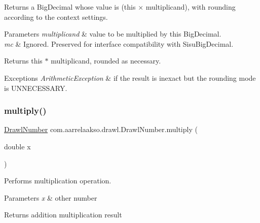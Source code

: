 Returns a Big\+Decimal whose value is (this × multiplicand), with rounding according to the context settings. 


\begin{DoxyParams}{Parameters}
{\em multiplicand} & value to be multiplied by this Big\+Decimal. \\
\hline
{\em mc} & Ignored. Preserved for interface compatibility with Sisu\+Big\+Decimal. \\
\hline
\end{DoxyParams}
\begin{DoxyReturn}{Returns}
this $\ast$ multiplicand, rounded as necessary. 
\end{DoxyReturn}

\begin{DoxyExceptions}{Exceptions}
{\em Arithmetic\+Exception} & if the result is inexact but the rounding mode is U\+N\+N\+E\+C\+E\+S\+S\+A\+RY. \\
\hline
\end{DoxyExceptions}
\mbox{\label{classcom_1_1aarrelaakso_1_1drawl_1_1_drawl_number_a8eb1872ac149fcad193f46fc8a6fa0ad}} 
\subsubsection{\texorpdfstring{multiply()}{multiply()}\hspace{0.1cm}{\footnotesize\ttfamily [3/3]}}
{\footnotesize\ttfamily \hyperlink{classcom_1_1aarrelaakso_1_1drawl_1_1_drawl_number}{Drawl\+Number} com.\+aarrelaakso.\+drawl.\+Drawl\+Number.\+multiply (\begin{DoxyParamCaption}\item[{double}]{x }\end{DoxyParamCaption})\hspace{0.3cm}{\ttfamily [protected]}}



Performs multiplication operation. 


\begin{DoxyParams}{Parameters}
{\em x} & other number \\
\hline
\end{DoxyParams}
\begin{DoxyReturn}{Returns}
addition multiplication result 
\end{DoxyReturn}
\mbox{\label{classcom_1_1aarrelaakso_1_1drawl_1_1_drawl_number_a1093e80c570f85142255528e4d31820d}} 
